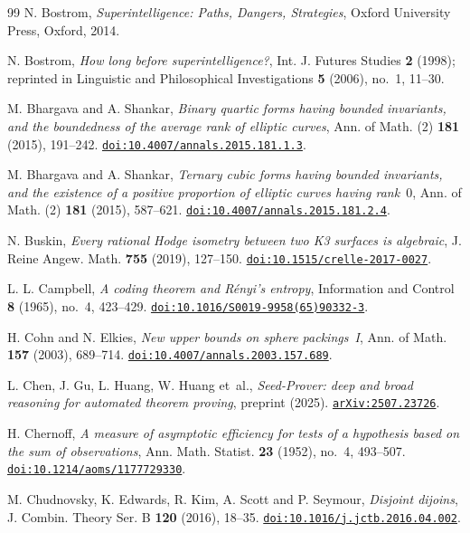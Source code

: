 \begin{thebibliography}{99}
N. Bostrom,
\emph{Superintelligence: Paths, Dangers, Strategies},
Oxford University Press, Oxford, 2014.

N. Bostrom,
\emph{How long before superintelligence?},
Int. J. Futures Studies \textbf{2} (1998); reprinted in Linguistic and Philosophical Investigations \textbf{5} (2006), no.~1, 11--30.

M. Bhargava and A. Shankar,
\emph{Binary quartic forms having bounded invariants, and the boundedness of the average rank of elliptic curves},
Ann. of Math. (2) \textbf{181} (2015), 191--242.
\href{https://doi.org/10.4007/annals.2015.181.1.3}{\nolinkurl{doi:10.4007/annals.2015.181.1.3}}.

M. Bhargava and A. Shankar,
\emph{Ternary cubic forms having bounded invariants, and the existence of a positive proportion of elliptic curves having rank~$0$},
Ann. of Math. (2) \textbf{181} (2015), 587--621.
\href{https://doi.org/10.4007/annals.2015.181.2.4}{\nolinkurl{doi:10.4007/annals.2015.181.2.4}}.

N. Buskin,
\emph{Every rational Hodge isometry between two K3 surfaces is algebraic},
J. Reine Angew. Math. \textbf{755} (2019), 127--150.
\href{https://doi.org/10.1515/crelle-2017-0027}{\nolinkurl{doi:10.1515/crelle-2017-0027}}.

L. L. Campbell,
\emph{A coding theorem and R\'enyi's entropy},
Information and Control \textbf{8} (1965), no.~4, 423--429.
\href{https://doi.org/10.1016/S0019-9958(65)90332-3}{\nolinkurl{doi:10.1016/S0019-9958(65)90332-3}}.

H. Cohn and N. Elkies,
\emph{New upper bounds on sphere packings~I},
Ann. of Math. \textbf{157} (2003), 689--714.
\href{https://doi.org/10.4007/annals.2003.157.689}{\nolinkurl{doi:10.4007/annals.2003.157.689}}.

L. Chen, J. Gu, L. Huang, W. Huang et~al.,
\emph{Seed-Prover: deep and broad reasoning for automated theorem proving},
preprint (2025).
\href{https://arxiv.org/abs/2507.23726}{\nolinkurl{arXiv:2507.23726}}.

H. Chernoff,
\emph{A measure of asymptotic efficiency for tests of a hypothesis based on the sum of observations},
Ann. Math. Statist. \textbf{23} (1952), no.~4, 493--507.
\href{https://doi.org/10.1214/aoms/1177729330}{\nolinkurl{doi:10.1214/aoms/1177729330}}.

M. Chudnovsky, K. Edwards, R. Kim, A. Scott and P. Seymour,
\emph{Disjoint dijoins},
J. Combin. Theory Ser. B \textbf{120} (2016), 18--35.
\href{https://doi.org/10.1016/j.jctb.2016.04.002}{\nolinkurl{doi:10.1016/j.jctb.2016.04.002}}.


\end{thebibliography}
